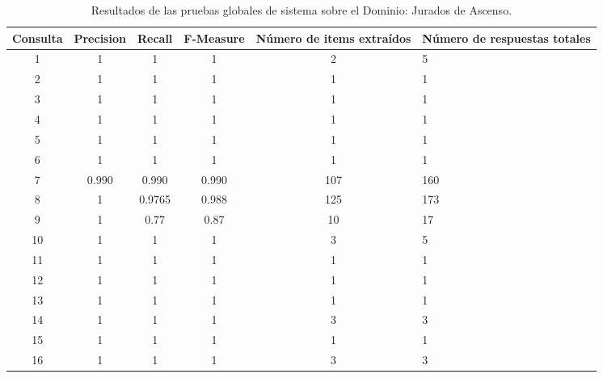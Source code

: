 \begin{table}[h]
\centering
\caption{ Resultados de las pruebas globales de sistema sobre el Dominio: Jurados de Ascenso.}
\centering
\scriptsize
\begin{tabular*}{1\textwidth}{@{\extracolsep{\fill}} | c | c | c | c | c | }
\hline
Consulta & Precision & Recall & F-Measure & Número de items extraídos & Número de respuestas totales \\
 & 1 & 1 & 1 & 2 & 5 \\
2 & 1 & 1 & 1 & 1 & 1 \\
3 & 1 & 1 & 1 & 1 & 1 \\
4 & 1 & 1 & 1 & 1 & 1 \\
5 & 1 & 1 & 1 & 1 & 1 \\
6 & 1 & 1 & 1 & 1 & 1 \\
7 & 0.990 & 0.990 & 0.990 & 107 & 160 \\
8 & 1 & 0.9765 & 0.988 & 125 & 173 \\
9 & 1 & 0.77 & 0.87 & 10 & 17 \\ %
10 & 1 & 1 & 1 & 3 & 5 \\ %
11 & 1 & 1 & 1 & 1 & 1 \\ %
12 & 1 & 1 & 1 & 1 & 1 \\ %
13 & 1 & 1 & 1 & 1 & 1 \\ %
14 & 1 & 1 & 1 & 3 & 3 \\ %
15 & 1 & 1 & 1 & 1 & 1 \\ %
16 & 1 & 1 & 1 & 3 & 3 \\ %
\hline
\end{tabular*}
\label{tabla-resultados-pruebas-globales-JAscenso}

\end{table}

